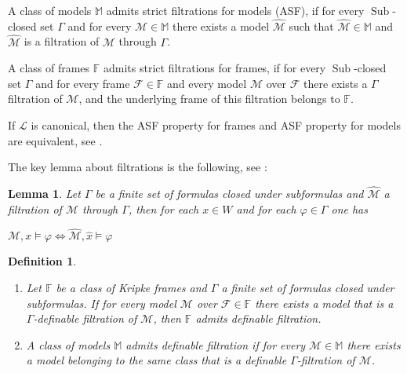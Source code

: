 \documentclass[a4paper]{article}
\theoremstyle{defin}
\newtheorem{defin}{Definition}
\theoremstyle{theorem}
\theoremstyle{prop}
\theoremstyle{lemma}
\newtheorem{lemma}{Lemma}
\theoremstyle{fact}
\theoremstyle{ex}
\theoremstyle{col}
\theoremstyle{claim}
\begin{document}
A class of models $\mathbb{M}$ admits strict filtrations for models (ASF), if for every $\operatorname{Sub}$-closed set $\Gamma$ and for every $\mathcal{M} \in \mathbb{M}$ there exists a model $\widehat{\mathcal{M}}$ such that $\widehat{\mathcal{M}} \in \mathbb{M}$ and $\widehat{\mathcal{M}}$ is a filtration of $\mathcal{M}$ through $\Gamma$.

A class of frames $\mathbb{F}$ admits strict filtrations for frames, if for every $\operatorname{Sub}$-closed set $\Gamma$ and for every frame $\mathcal{F} \in \mathbb{F}$ and every model $\mathcal{M}$ over $\mathcal{F}$ there exists a $\Gamma$ filtration of $\mathcal{M}$, and the underlying frame of this filtration belongs to $\mathbb{F}$.

If $\mathcal{L}$ is canonical, then the ASF property for frames and ASF property for models are equivalent, see \cite[Theorem 2.10]{kikot2020completeness}.

The key lemma about filtrations is the following, see \cite[Theorem 2.39]{blackburn_rijke_venema_2001}:

\begin{lemma}
  Let $\Gamma$ be a finite set of formulas closed under subformulas and $\widehat{\mathcal{M}}$ a filtration of $\mathcal{M}$ through $\Gamma$, then for each $x \in W$ and for each $\varphi \in \Gamma$ one has
  \begin{center}
    $\mathcal{M}, x \models \varphi \Leftrightarrow \widehat{\mathcal{M}}, \hat{x} \models \varphi$
  \end{center}
\end{lemma}

\begin{defin}
$ $

  \begin{enumerate}
    \item Let $\mathbb{F}$ be a class of Kripke frames and $\Gamma$ a finite set of formulas closed under subformulas. If for every model $\mathcal{M}$ over $\mathcal{F} \in \mathbb{F}$ there exists a model that is a $\Gamma$-definable filtration of $\mathcal{M}$, then $\mathbb{F}$ admits definable filtration.

    \item A class of models $\mathbb{M}$ admits definable filtration if for every $\mathcal{M} \in \mathbb{M}$ there exists a model belonging to the same class that is a definable $\Gamma$-filtration of $\mathcal{M}$.
  \end{enumerate}
\end{defin}
\end{document}
